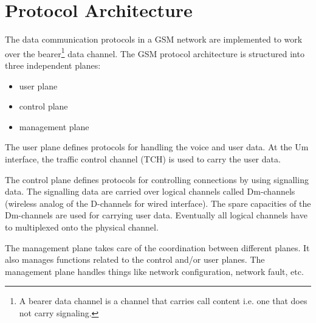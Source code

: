 \section{Protocol Architecture}
The data communication protocols in a GSM network are implemented to work over
the bearer\footnote{A bearer data channel is a channel that carries call 
content i.e.
one that does not carry signaling.} data channel. 
The GSM protocol architecture is structured into three independent planes:
\begin{itemize}[noitemsep,topsep=0pt,parsep=0pt,partopsep=0pt]
 \item user plane
 \item control plane
 \item management plane
\end{itemize}

The user plane defines protocols for handling the voice and user data. 
At the Um interface, the traffic control channel (TCH) is used to carry the 
user data.


The control plane defines protocols for controlling connections by using 
signalling data.
The signalling data are carried over logical channels called Dm-channels 
(wireless analog of the D-channels for wired interface).
The spare capacities of the Dm-channels are used for carrying user data.
Eventually all logical channels have to multiplexed onto the physical channel.


The management plane takes care of the coordination between different planes.
It also manages functions related to the control and/or user planes.
The management plane handles things like network configuration, network fault,
etc.


